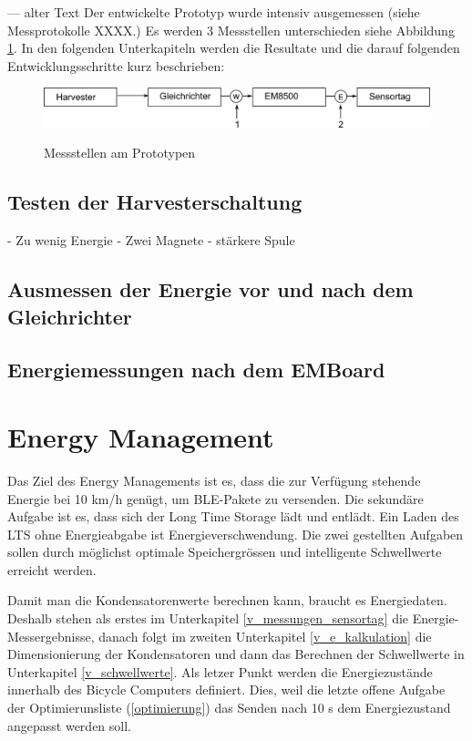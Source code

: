 --- alter Text
Der entwickelte Prototyp wurde intensiv ausgemessen (siehe Messprotokolle XXXX.)  Es werden 3 Messstellen unterschieden siehe Abbildung \ref{EnergieMessungStellen}. In den folgenden Unterkapiteln werden die Resultate und die darauf folgenden Entwicklungsschritte kurz beschrieben:

\begin{figure}[ht]
  \includegraphics[width=1.0\textwidth]{3Vorgehen/imag/EnergiemessungStellen.png}\label{EnergieMessungStellen} 
  \caption{Messstellen am Prototypen}
\end{figure}

\subsection{Testen der Harvesterschaltung}

- Zu wenig Energie
- Zwei Magnete
- stärkere Spule

\subsection{Ausmessen der Energie vor und nach dem Gleichrichter}


\subsection{Energiemessungen nach dem EMBoard}



\section{Energy Management}

Das Ziel des Energy Managements ist es, dass die zur Verfügung stehende Energie bei 10 km/h genügt, um BLE-Pakete zu versenden. Die sekundäre Aufgabe ist es, dass sich der Long Time Storage lädt und entlädt. Ein Laden des LTS ohne Energieabgabe ist Energieverschwendung. Die zwei gestellten Aufgaben sollen durch möglichst optimale Speichergrössen und intelligente Schwellwerte erreicht werden.

Damit man die Kondensatorenwerte berechnen kann, braucht es Energiedaten. Deshalb stehen als erstes im Unterkapitel \ref{v_messungen_sensortag} die Energie-Messergebnisse, danach folgt im zweiten Unterkapitel \ref{v_e_kalkulation} die Dimensionierung der Kondensatoren und dann das Berechnen der Schwellwerte in Unterkapitel \ref{v_schwellwerte}. Als letzer Punkt werden die Energiezustände innerhalb des Bicycle Computers definiert. Dies, weil die letzte offene Aufgabe der Optimierunsliste (\ref{optimierung}) das Senden nach 10 s dem Energiezustand angepasst werden soll.


